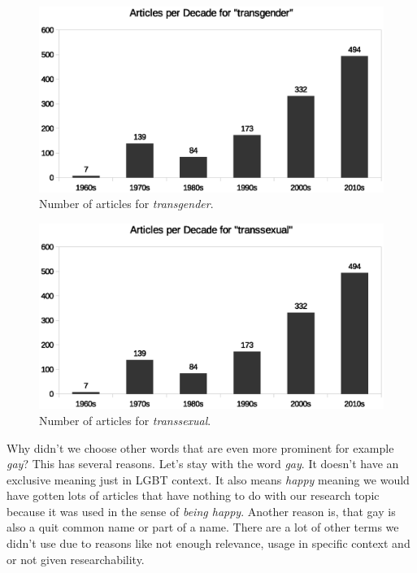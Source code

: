 \documentclass[10pt,a4paper,twocolumn]{scrartcl}
\begin{document}
\begin{figure}
\includegraphics[width=\columnwidth]{figures/transgender_decade}
\caption{Number of articles for \textit{transgender}.} \label{fig:transgender}
\end{figure}

\begin{figure}
\includegraphics[width=\columnwidth]{figures/transsexual_decade}
\caption{Number of articles for \textit{transsexual}.} \label{fig:transsexual}
\end{figure}


Why didn't we choose other words that are even more prominent for example \textit{gay}? This has several reasons. Let's stay with the word \textit{gay}. It doesn't have an exclusive meaning just in LGBT context. It also means \textit{happy} meaning we would have gotten lots of articles that have nothing to do with our research topic because it was used in the sense of \textit{being happy}. Another reason is, that gay is also a quit common name or part of a name. 
There are a lot of other terms we didn't use due to reasons like not enough relevance, usage in specific context and or not given researchability. 
\end{document}
